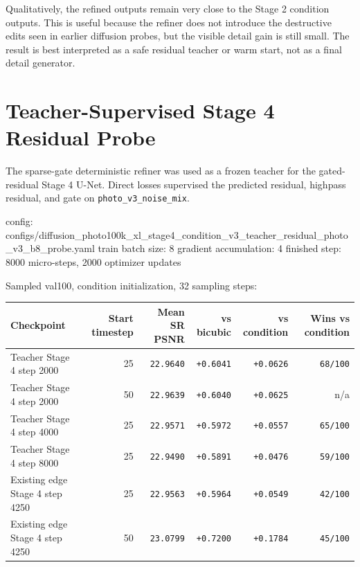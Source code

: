 \documentclass[
  10pt,
]{article}
\newenvironment{Shaded}{}{}
\newcommand{\NormalTok}[1]{#1}
\begin{document}
Qualitatively, the refined outputs remain very close to the Stage 2
condition outputs. This is useful because the refiner does not introduce
the destructive edits seen in earlier diffusion probes, but the visible
detail gain is still small. The result is best interpreted as a safe
residual teacher or warm start, not as a final detail generator.

\hypertarget{teacher-supervised-stage-4-residual-probe}{%
\section{Teacher-Supervised Stage 4 Residual
Probe}\label{teacher-supervised-stage-4-residual-probe}}

The sparse-gate deterministic refiner was used as a frozen teacher for
the gated-residual Stage 4 U-Net. Direct losses supervised the predicted
residual, highpass residual, and gate on \texttt{photo\_v3\_noise\_mix}.

\begin{Shaded}
\begin{Highlighting}[]
\NormalTok{config: configs/diffusion\_photo100k\_xl\_stage4\_condition\_v3\_teacher\_residual\_photo\_v3\_b8\_probe.yaml}
\NormalTok{train batch size: 8}
\NormalTok{gradient accumulation: 4}
\NormalTok{finished step: 8000 micro{-}steps, 2000 optimizer updates}
\end{Highlighting}
\end{Shaded}

Sampled val100, condition initialization, 32 sampling steps:

\begin{longtable}[]{@{}lrrrrr@{}}
\toprule\noalign{}
Checkpoint & Start timestep & Mean SR PSNR & vs bicubic & vs condition &
Wins vs condition \\
\midrule\noalign{}
\endhead
\bottomrule\noalign{}
\endlastfoot
Teacher Stage 4 step 2000 & 25 & \texttt{22.9640} & \texttt{+0.6041} &
\texttt{+0.0626} & \texttt{68/100} \\
Teacher Stage 4 step 2000 & 50 & \texttt{22.9639} & \texttt{+0.6040} &
\texttt{+0.0625} & n/a \\
Teacher Stage 4 step 4000 & 25 & \texttt{22.9571} & \texttt{+0.5972} &
\texttt{+0.0557} & \texttt{65/100} \\
Teacher Stage 4 step 8000 & 25 & \texttt{22.9490} & \texttt{+0.5891} &
\texttt{+0.0476} & \texttt{59/100} \\
Existing edge Stage 4 step 4250 & 25 & \texttt{22.9563} &
\texttt{+0.5964} & \texttt{+0.0549} & \texttt{42/100} \\
Existing edge Stage 4 step 4250 & 50 & \texttt{23.0799} &
\texttt{+0.7200} & \texttt{+0.1784} & \texttt{45/100} \\
\end{longtable}
\end{document}
